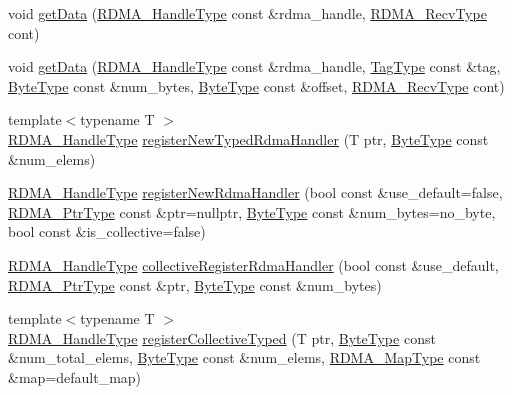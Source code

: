 \begin{DoxyCompactItemize}
\item 
void \hyperlink{structvt_1_1rdma_1_1_r_d_m_a_manager_aebefa1395f990efb66284adc1495f6d4}{get\+Data} (\hyperlink{namespacevt_a10442579ec4e7ebef223818e64bcf908}{R\+D\+M\+A\+\_\+\+Handle\+Type} const \&rdma\+\_\+handle, \hyperlink{namespacevt_1_1rdma_aa07fa86d8eca8853254b40fc0e565726}{R\+D\+M\+A\+\_\+\+Recv\+Type} cont)
\item 
void \hyperlink{structvt_1_1rdma_1_1_r_d_m_a_manager_a214cf0d741a5dd197e12a3fcd6ea2c47}{get\+Data} (\hyperlink{namespacevt_a10442579ec4e7ebef223818e64bcf908}{R\+D\+M\+A\+\_\+\+Handle\+Type} const \&rdma\+\_\+handle, \hyperlink{namespacevt_a84ab281dae04a52a4b243d6bf62d0e52}{Tag\+Type} const \&tag, \hyperlink{namespacevt_aab8d55968084610ce3b17057981e9300}{Byte\+Type} const \&num\+\_\+bytes, \hyperlink{namespacevt_aab8d55968084610ce3b17057981e9300}{Byte\+Type} const \&offset, \hyperlink{namespacevt_1_1rdma_aa07fa86d8eca8853254b40fc0e565726}{R\+D\+M\+A\+\_\+\+Recv\+Type} cont)
\item 
{\footnotesize template$<$typename T $>$ }\\\hyperlink{namespacevt_a10442579ec4e7ebef223818e64bcf908}{R\+D\+M\+A\+\_\+\+Handle\+Type} \hyperlink{structvt_1_1rdma_1_1_r_d_m_a_manager_a69d6fc1f017047de79f3c1190e55ac53}{register\+New\+Typed\+Rdma\+Handler} (T ptr, \hyperlink{namespacevt_aab8d55968084610ce3b17057981e9300}{Byte\+Type} const \&num\+\_\+elems)
\item 
\hyperlink{namespacevt_a10442579ec4e7ebef223818e64bcf908}{R\+D\+M\+A\+\_\+\+Handle\+Type} \hyperlink{structvt_1_1rdma_1_1_r_d_m_a_manager_ab68308f4b3b72714f81a00755736b0b5}{register\+New\+Rdma\+Handler} (bool const \&use\+\_\+default=false, \hyperlink{namespacevt_a9e2c953286c7616f7c218e9951790776}{R\+D\+M\+A\+\_\+\+Ptr\+Type} const \&ptr=nullptr, \hyperlink{namespacevt_aab8d55968084610ce3b17057981e9300}{Byte\+Type} const \&num\+\_\+bytes=no\+\_\+byte, bool const \&is\+\_\+collective=false)
\item 
\hyperlink{namespacevt_a10442579ec4e7ebef223818e64bcf908}{R\+D\+M\+A\+\_\+\+Handle\+Type} \hyperlink{structvt_1_1rdma_1_1_r_d_m_a_manager_a526b7c441125a9d5ed9528736be97819}{collective\+Register\+Rdma\+Handler} (bool const \&use\+\_\+default, \hyperlink{namespacevt_a9e2c953286c7616f7c218e9951790776}{R\+D\+M\+A\+\_\+\+Ptr\+Type} const \&ptr, \hyperlink{namespacevt_aab8d55968084610ce3b17057981e9300}{Byte\+Type} const \&num\+\_\+bytes)
\item 
{\footnotesize template$<$typename T $>$ }\\\hyperlink{namespacevt_a10442579ec4e7ebef223818e64bcf908}{R\+D\+M\+A\+\_\+\+Handle\+Type} \hyperlink{structvt_1_1rdma_1_1_r_d_m_a_manager_ad851bdc250182163eb4996888ba1b863}{register\+Collective\+Typed} (T ptr, \hyperlink{namespacevt_aab8d55968084610ce3b17057981e9300}{Byte\+Type} const \&num\+\_\+total\+\_\+elems, \hyperlink{namespacevt_aab8d55968084610ce3b17057981e9300}{Byte\+Type} const \&num\+\_\+elems, \hyperlink{structvt_1_1rdma_1_1_r_d_m_a_manager_a16e12d11cf7d771df0d3dc6947a4f95c}{R\+D\+M\+A\+\_\+\+Map\+Type} const \&map=default\+\_\+map)

\end{DoxyCompactItemize}

